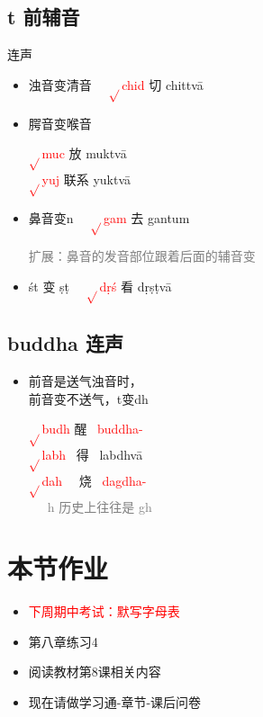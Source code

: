 \documentclass[17pt]{beamer}
\newcommand{\verbroot}[1]{\textcolor{red}{$\sqrt{}$#1}}
\newcommand{\nounstem}[1]{\textcolor{red}{#1\nobreakdash-}}
\newcommand{\fullpada}[1]{\textcolor{OliveGreen}{#1}}
\newcommand{\veryimportant}[1]{\textcolor{red}{#1}}
\newcommand{\notsoimportant}[1]{\textcolor{gray}{#1}}
\begin{document}
\subsection{t 前辅音}
\begin{frame}{\insertsubsection 连声}
  \begin{itemize}
    \item 浊音变清音
    ~~\verbroot{chid} 切 \fullpada{chittvā}

    \item 腭音变喉音

    \verbroot{muc} 放 \fullpada{muktvā} \\
    \verbroot{yuj} 联系 \fullpada{yuktvā}
    \item 鼻音变n   
    ~~\verbroot{gam} 去 \fullpada{gantum} 

    {\small
    \notsoimportant{扩展：鼻音的发音部位跟着后面的辅音变}}
    \item śt 变 ṣṭ
    ~~\verbroot{dṛś} 看 \fullpada{dṛṣṭvā}  
  \end{itemize}  
\end{frame}

\subsection{buddha 连声}
\begin{frame}{\insertsubsection}
  \begin{itemize}
    \item 前音是送气浊音时，\\前音变不送气，t变dh 
    
    \verbroot{budh} 醒 ~\nounstem{buddha} \\
    \verbroot{labh} ~得 ~\fullpada{labdhvā} \\
    \verbroot{dah} ~~烧 ~\nounstem{dagdha} \\
    ~~~\notsoimportant{h 历史上往往是 gh}
  \end{itemize}  
\end{frame}

\section{本节作业}

\begin{frame}{\insertsection }
  \begin{itemize}
    \item
      \veryimportant{下周期中考试：默写字母表}
    \item
      第八章练习4
    \item
      阅读教材第8课相关内容
    \bigskip
    \item
      现在请做学习通\nobreakdash-章节\nobreakdash-课后问卷
  \end{itemize}
\end{frame}  
\end{document}

